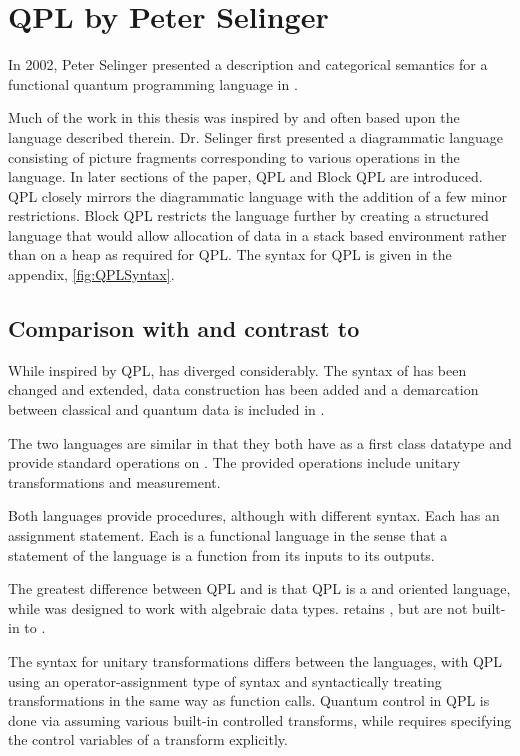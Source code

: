 \section{QPL by Peter Selinger}\label{sec:semanticsQPLSelinger}
In 2002, Peter Selinger presented a description and categorical semantics
for a functional quantum programming language in \cite{selinger04:qpl}.

Much of the work in this thesis was inspired by and often based upon the
language described therein. 
Dr. Selinger first presented a
diagrammatic language consisting of picture fragments corresponding to 
various operations in the language. In later sections of the paper, 
QPL and Block QPL
are introduced. QPL closely mirrors the diagrammatic language with the
addition of a few minor restrictions. Block QPL restricts the language
further by creating a structured language that would allow allocation of
data in a stack based environment rather than on a heap as required for 
QPL. The syntax for QPL is given in the appendix, \vref{fig:QPLSyntax}.

\subsection{Comparison with and contrast to \lqpl{}}\label{subsec:qplcomparisontolqpl}
While inspired by QPL, \lqpl{} has diverged considerably. The syntax  
of \lqpl{} has been
changed and extended, data construction has been added and a demarcation
between classical and quantum data is included in \lqpl.

The two languages are similar in that they both have \qbits{} as 
a first class datatype and provide standard operations on 
\qbits. The provided operations include unitary transformations and
measurement. 

Both languages provide procedures, although with different syntax. 
Each has an assignment statement. Each is a functional language
in the sense that a statement of the language is a function from
its inputs to its outputs.

The greatest difference between QPL and \lqpl{} is 
that QPL is a \bit{} and \qbit{} oriented language, while
\lqpl{} was designed to work with algebraic data types. \lqpl{} 
retains \qbits{}, but \bits{} are not built-in to \lqpl{}. 

The syntax for unitary transformations differs between the languages,
with QPL using an operator-assignment type of syntax and \lqpl{} syntactically
treating transformations in the same way as function calls. Quantum control
in QPL is done via assuming various built-in controlled transforms, while
\lqpl{} requires specifying the control variables of a transform explicitly.

